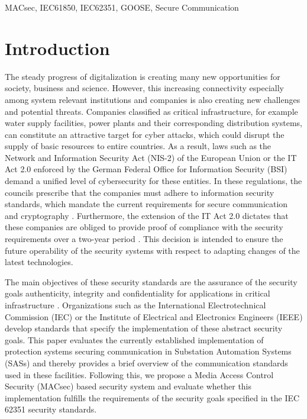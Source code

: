 \documentclass[conference, onecolumn, a4paper]{IEEEtran}
\begin{document}
\vspace{6 pt}

\begin{IEEEkeywords}
    MACsec, IEC61850, IEC62351, GOOSE, Secure Communication
\end{IEEEkeywords}

\section{Introduction}
\label{chapter:introduction}
\noindent The steady progress of digitalization is creating many new opportunities for society, business and science. However, this increasing connectivity 
especially among system relevant institutions and companies is also creating new challenges and potential threats. Companies classified as critical 
infrastructure, for example water supply facilities, power plants and their corresponding distribution systems, can constitute an attractive target for 
cyber attacks, which could disrupt the supply of basic resources to entire countries. As a result, laws such as the Network and Information Security Act 
(NIS-2) \cite{NIS-2:2022} of the European Union or the IT Act 2.0 \cite{IT-Gesetz_2:2021} enforced by the German Federal Office for Information Security 
(BSI) demand a unified level of cybersecurity for these entities. In these regulations, the councils prescribe that the companies must adhere to information 
security standards, which mandate the current requirements for secure communication and cryptography \cite[p. 9]{BSI-ISMS:2017}. Furthermore, the 
extension of the IT Act 2.0 dictates that these companies are obliged to provide proof of compliance with the security requirements over a two-year 
period \cite[§11 (1e)]{IT-Gesetz_2:2021}. This decision is intended to ensure the future operability of the security systems with respect to adapting 
changes of the latest technologies. 

\smallskip
The main objectives of these security standards are the assurance of the security goals authenticity, integrity and confidentiality for applications in 
critical infrastructure \cite[§2 (13)]{IT-Gesetz_2:2021}. Organizations such as the International Electrotechnical Commission (IEC) or the Institute of 
Electrical and Electronics Engineers (IEEE) develop standards that specify the implementation of these abstract security goals. This paper evaluates the 
currently established implementation of protection systems securing communication in Substation Automation Systems (SASs) and thereby provides a brief 
overview of the communication standards used in these facilities. Following this, we propose a Media Access Control Security (MACsec) based security system 
and evaluate whether this implementation fulfills the requirements of the security goals specified in the IEC 62351 security standards. 
\end{document}
